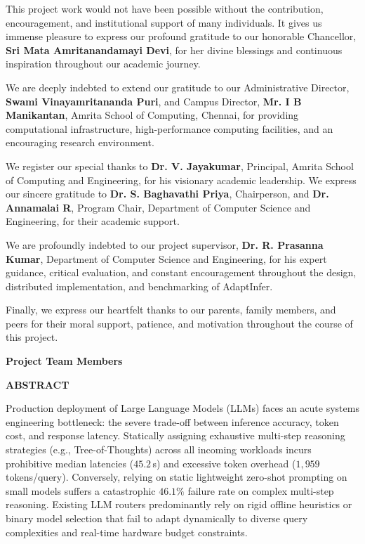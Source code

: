 \documentclass[12pt,a4paper]{report}
\begin{document}
This project work would not have been possible without the contribution, encouragement, and institutional support of many individuals. It gives us immense pleasure to express our profound gratitude to our honorable Chancellor, \textbf{Sri Mata Amritanandamayi Devi}, for her divine blessings and continuous inspiration throughout our academic journey.

We are deeply indebted to extend our gratitude to our Administrative Director, \textbf{Swami Vinayamritananda Puri}, and Campus Director, \textbf{Mr. I B Manikantan}, Amrita School of Computing, Chennai, for providing computational infrastructure, high-performance computing facilities, and an encouraging research environment.

We register our special thanks to \textbf{Dr. V. Jayakumar}, Principal, Amrita School of Computing and Engineering, for his visionary academic leadership. We express our sincere gratitude to \textbf{Dr. S. Baghavathi Priya}, Chairperson, and \textbf{Dr. Annamalai R}, Program Chair, Department of Computer Science and Engineering, for their academic support.

We are profoundly indebted to our project supervisor, \textbf{Dr. R. Prasanna Kumar}, Department of Computer Science and Engineering, for his expert guidance, critical evaluation, and constant encouragement throughout the design, distributed implementation, and benchmarking of AdaptInfer.

Finally, we express our heartfelt thanks to our parents, family members, and peers for their moral support, patience, and motivation throughout the course of this project.

\vspace{1.5cm}
\noindent
\textbf{Project Team Members}

\newpage
\begin{center}
    {\large \textbf{ABSTRACT}\par}
    \vspace{1.0cm}
\end{center}

Production deployment of Large Language Models (LLMs) faces an acute systems engineering bottleneck: the severe trade-off between inference accuracy, token cost, and response latency. Statically assigning exhaustive multi-step reasoning strategies (e.g., Tree-of-Thoughts) across all incoming workloads incurs prohibitive median latencies ($45.2$\,s) and excessive token overhead ($1,959$ tokens/query). Conversely, relying on static lightweight zero-shot prompting on small models suffers a catastrophic $46.1\%$ failure rate on complex multi-step reasoning. Existing LLM routers predominantly rely on rigid offline heuristics or binary model selection that fail to adapt dynamically to diverse query complexities and real-time hardware budget constraints.
\end{document}
